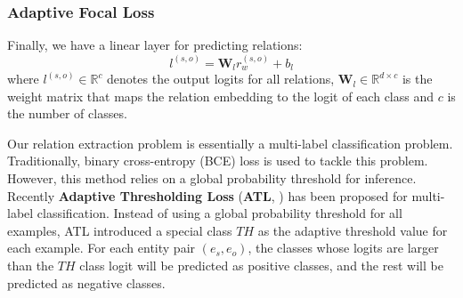 \documentclass[11pt]{article}
\begin{document}
\subsubsection{Adaptive Focal Loss}



Finally, we have a linear layer for predicting relations:
\begin{equation}
    {l}^{(s,o)} = \mathbf{W}_{l}r^{(s, o)}_{w} + b_{l}
\end{equation}
where ${l}^{(s,o)} \in \mathbb{R}^{c}$ denotes the output logits for all relations, $\mathbf{W}_{l} \in \mathbb{R}^{{d} \times {c}}$ is the weight matrix that maps the relation embedding to the logit of each class and $c$ is the number of classes. 

Our relation extraction problem is essentially a multi-label classification problem. Traditionally, binary cross-entropy (BCE) loss is used to tackle this problem. However, this method relies on a global probability threshold for inference. Recently \textbf{Adaptive Thresholding Loss} (\textbf{ATL}, \citealp{zhou2021document}) has been proposed for multi-label classification. Instead of using a global probability threshold for all examples, ATL introduced a special class $TH$ as the adaptive threshold value for each example. For each entity pair $(e_s, e_o)$, the classes whose logits are larger than the $TH$ class logit will be predicted as positive classes, and the rest will be predicted as negative classes. 
\end{document}
